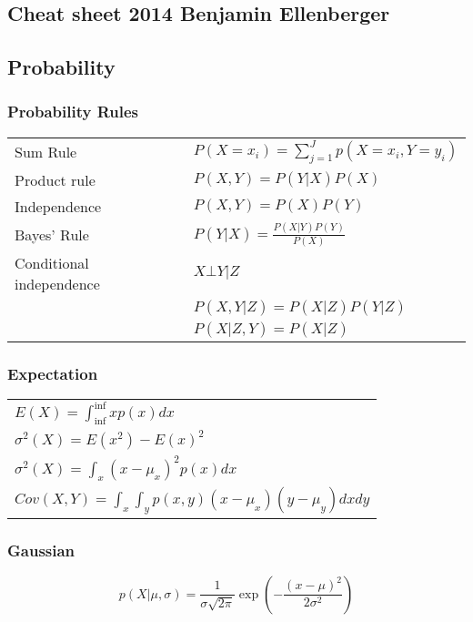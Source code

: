 \documentclass[main]{subfiles}
\begin{document}
\begin{landscape}
\ifx\cheatsheet\undefined
{}
\else
{\color{sectionColor}\section{Cheat sheet 2014 Benjamin Ellenberger}} %
\fi

%
%
\begin{multicols}{4}
\scriptsize
{\color{subsectionColor}\subsection{Probability}}
{\color{subsubsectionColor}\subsubsection{Probability Rules}}
\begin{tabular}{p{5em}l}
Sum Rule& \(P(X=x_i) = \sum_{j=1}^{J} p(X=x_i,Y=y_i)\)\\
Product rule& \(P(X, Y) = P(Y|X) P(X)\) \\
Independence& \(P(X, Y) = P(X)P(Y)\) \\
Bayes' Rule& \(P(Y|X) = \frac{P(X|Y)P(Y)}{P(X)}\) \\
Conditional independence& \(X\bot Y|Z \)\\
 & \(P(X,Y|Z) = P(X|Z)P(Y|Z)\) \\
 & \(P(X|Z,Y) = P(X|Z)\)
\end{tabular}
{\color{subsubsectionColor}\subsubsection{Expectation}}
\begin{tabular}{l}
\(E(X) = \int_{\inf}^{\inf} x p(x) dx\) \\
\(\sigma^2(X) = E(x^2)-{E(x)}^2\) \\
\(\sigma^2(X) = \int_x (x-\mu_x)^2 p(x) dx\) \\
\(Cov(X, Y) = \int_x \int_y p(x,y) (x-\mu_x)(y-\mu_y) dx dy\)
\end{tabular}

{\color{subsubsectionColor}\subsubsection{Gaussian}}
\begin{equation}
p(X|\mu,\sigma)=\frac{1}{\sigma \sqrt{2\pi}} \exp(-\frac{(x-\mu)^2}{2\sigma^2})
\end{equation}


\end{multicols}
\end{landscape}
\end{document}
